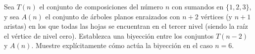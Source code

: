 Sea \(T(n)\) el conjunto de composiciones del número \(n\) con sumandos en \(\{1,2,3\}\), y sea \(A(n)\) el conjunto de árboles planos enraizados con \(n+2\) vértices (y \(n+1\) aristas) en los que todas las hojas se encuentran en el tercer nivel (siendo la raíz el vértice de nivel cero). Establezca una biyección entre los conjuntos \(T(n-2)\) y \(A(n)\). Muestre explícitamente cómo actúa la biyección en el caso \(n=6\).
